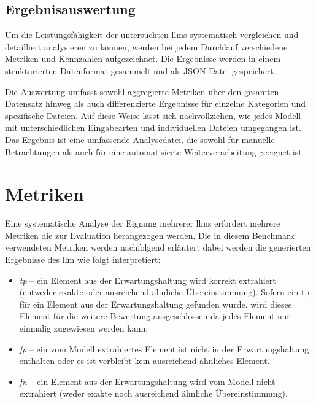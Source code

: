 
\subsection{Ergebnisauswertung}\label{subsec:ergebnisauswertung}

Um die Leistungsfähigkeit der untersuchten \glspl{llm} systematisch vergleichen und detailliert analysieren zu können, werden bei jedem Durchlauf verschiedene Metriken und Kennzahlen aufgezeichnet.
Die Ergebnisse werden in einem strukturierten Datenformat gesammelt und als JSON-Datei gespeichert.

Die Auswertung umfasst sowohl aggregierte Metriken über den gesamten Datensatz hinweg als auch differenzierte Ergebnisse für einzelne Kategorien und spezifische Dateien.
Auf diese Weise lässt sich nachvollziehen, wie jedes Modell mit unterschiedlichen Eingabearten und individuellen Dateien umgegangen ist.
Das Ergebnis ist eine umfassende Analysedatei, die sowohl für manuelle Betrachtungen als auch für eine automatisierte Weiterverarbeitung geeignet ist.


\section{Metriken}\label{sec:metriken-benchmark}

Eine systematische Analyse der Eignung mehrerer \glspl{llm} erfordert mehrere Metriken die zur Evaluation herangezogen werden.
Die in diesem Benchmark verwendeten Metriken werden nachfolgend erläutert dabei werden die generierten Ergebnisse des \gls{llm} wie folgt interpretiert:
\begin{itemize}
    \item \textit{\gls{tp}} -- ein Element aus der Erwartungshaltung wird korrekt extrahiert (entweder exakte oder ausreichend ähnliche Übereinstimmung). Sofern ein \gls{tp} für ein Element aus der Erwartungshaltung gefunden wurde, wird dieses Element für die weitere Bewertung ausgeschlossen da jedes Element nur einmalig zugewiesen werden kann.
    \item \textit{\gls{fp}} -- ein vom Modell extrahiertes Element ist nicht in der Erwartungshaltung enthalten oder es ist verbleibt kein ausreichend ähnliches Element.
    \item \textit{\gls{fn}} -- ein Element aus der Erwartungshaltung wird vom Modell nicht extrahiert (weder exakte noch ausreichend ähnliche Übereinstimmung).
\end{itemize}

